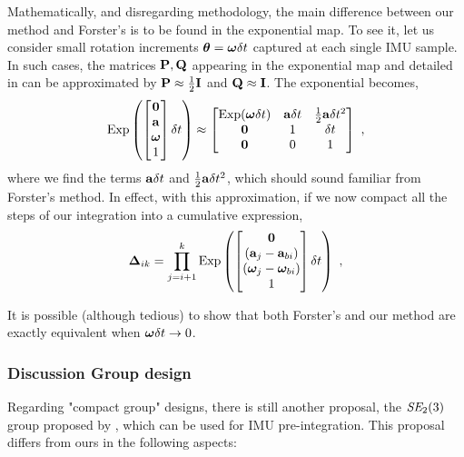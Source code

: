 Mathematically, and disregarding methodology, the main difference between our method and Forster's \cite{forster2017-TRO} is to be found in the exponential map. 
To see it, let us consider small rotation increments ${{\bm \theta}}={{\bm \omega}}\delta t$ captured at each single IMU sample. 
In such cases, the matrices ${\bf P},{\bf Q}$ appearing in the exponential map  and detailed in  can be approximated by ${\bf P}\approx\tfrac12{\bf I}$ and ${\bf Q}\approx{\bf I}$.
The exponential becomes,
%
\begin{align}
    \operatorname*{Exp}\left(\begin{bmatrix}
    \bf0 \\ {\bf a} \\ {{\bm \omega}} \\ 1
    \end{bmatrix}\delta t\right) \approx \begin{bmatrix}
    \operatorname*{Exp}({{\bm \omega}}\delta t) & {\bf a}\delta t & \tfrac12{\bf a}\delta t^2 \\
    \bf0 & 1 & \delta t \\
    \bf0 & 0 & 1
    \end{bmatrix}
~,
\end{align}
%
where we find the terms ${\bf a}\delta t$ and $\tfrac12{\bf a}\delta t^2$, which should sound familiar from Forster's method. 
In effect, with this approximation, if we now compact all the steps  of our integration into a cumulative expression,
%
\begin{align}
    {{\bm \Delta}}_{ik} = \prod_{j=i+1}^k \operatorname*{Exp}\left(\begin{bmatrix}
    \bf0 \\ ({\bf a}_j-{\bf a}_{bi}) \\ ({{\bm \omega}}_j-{{\bm \omega}}_{bi}) \\ 1
    \end{bmatrix}\delta t\right)
~,
\end{align}

It is possible (although tedious) to show that both Forster's and our method are exactly equivalent when ${{\bm \omega}}\delta t\to0$.

\subsubsection{Discussion Group design}
Regarding "compact group" designs, there is still another proposal, the $\textit{SE}_2(3)$ group proposed by \cite{barrau2020mathematical, brossard2021associating}, 
which can be used for IMU pre-integration. This proposal differs from ours in the following aspects:

